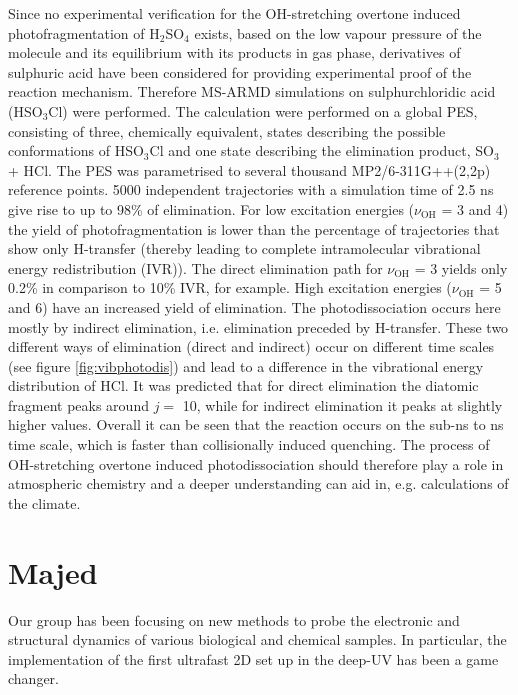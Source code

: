 \documentclass[journal=jacsat,manuscript=article]{achemso}
\begin{document}
\noindent
Since no experimental verification for the OH-stretching overtone
induced photofragmentation of H$_2$SO$_4$ exists, based on the low
vapour pressure of the molecule and its equilibrium with its products
in gas phase, derivatives of sulphuric acid have been considered for
providing experimental proof of the reaction mechanism. Therefore
MS-ARMD simulations on sulphurchloridic acid (HSO$_3$Cl) were
performed\cite{reyesbrickel.pccp.2016.msarmd}. The calculation were
performed on a global PES, consisting of three, chemically equivalent,
states describing the possible conformations of HSO$_3$Cl and one
state describing the elimination product, SO$_3$ + HCl. The PES was
parametrised to several thousand MP2/6-311G++(2,2p) reference
points. 5000 independent trajectories with a simulation time of 2.5 ns
give rise to up to 98\% of elimination. For low excitation energies
($\nu_{\text{OH}}$ = 3 and 4) the yield of photofragmentation is lower
than the percentage of trajectories that show only H-transfer (thereby
leading to complete intramolecular vibrational energy redistribution
(IVR)). The direct elimination path for $\nu_{\text{OH}}$ = 3 yields
only 0.2\% in comparison to 10\% IVR, for example. High excitation
energies ($\nu_{\text{OH}}$ = 5 and 6) have an increased yield of
elimination. The photodissociation occurs here mostly by indirect
elimination, i.e. elimination preceded by H-transfer. These two
different ways of elimination (direct and indirect) occur on different
time scales (see figure \ref{fig:vibphotodis}) and lead to a
difference in the vibrational energy distribution of HCl. It was
predicted that for direct elimination the diatomic fragment peaks
around $j = $ 10, while for indirect elimination it peaks at slightly
higher values. Overall it can be seen that the reaction occurs on the
sub-ns to ns time scale, which is faster than collisionally induced
quenching. The process of OH-stretching overtone induced
photodissociation should therefore play a role in atmospheric
chemistry and a deeper understanding can aid in, e.g. calculations of
the climate.


\section{Majed}
Our group has been focusing on new methods to probe the electronic and
structural dynamics of various biological and chemical samples. In
particular, the implementation of the first ultrafast 2D set up in the
deep-UV has been a game changer.\cite{aubock:2012,aubock2:2012}
\end{document}
